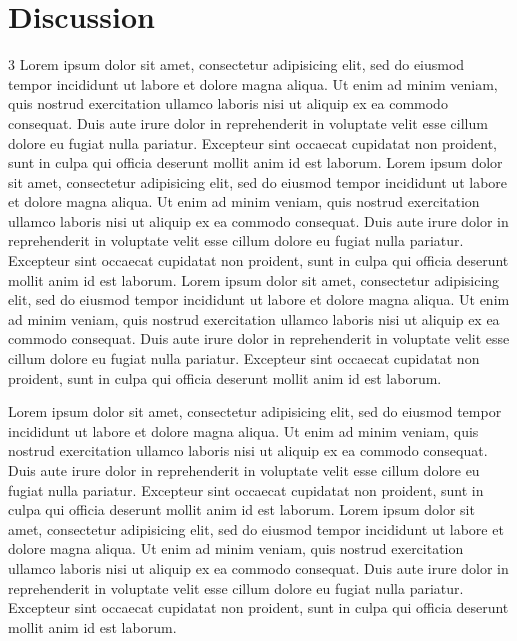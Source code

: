 \documentclass[kulak]{kulakposter}
\begin{document}
\section*{Discussion}
\begin{multicols}{3}\setlength{\columnseprule}{0pt}
	Lorem ipsum dolor sit amet, consectetur adipisicing elit, sed do eiusmod tempor incididunt ut labore et dolore magna aliqua. Ut enim ad minim veniam, quis nostrud exercitation ullamco laboris nisi ut aliquip ex ea commodo consequat. Duis aute irure dolor in reprehenderit in voluptate velit esse cillum dolore eu fugiat nulla pariatur. Excepteur sint occaecat cupidatat non proident, sunt in culpa qui officia deserunt mollit anim id est laborum. Lorem ipsum dolor sit amet, consectetur adipisicing elit, sed do eiusmod tempor incididunt ut labore et dolore magna aliqua. Ut enim ad minim veniam, quis nostrud exercitation ullamco laboris nisi ut aliquip ex ea commodo consequat. Duis aute irure dolor in reprehenderit in voluptate velit esse cillum dolore eu fugiat nulla pariatur. Excepteur sint occaecat cupidatat non proident, sunt in culpa qui officia deserunt mollit anim id est laborum.
	Lorem ipsum dolor sit amet, consectetur adipisicing elit, sed do eiusmod tempor incididunt ut labore et dolore magna aliqua. Ut enim ad minim veniam, quis nostrud exercitation ullamco laboris nisi ut aliquip ex ea commodo consequat. Duis aute irure dolor in reprehenderit in voluptate velit esse cillum dolore eu fugiat nulla pariatur. Excepteur sint occaecat cupidatat non proident, sunt in culpa qui officia deserunt mollit anim id est laborum.
	
	Lorem ipsum dolor sit amet, consectetur adipisicing elit, sed do eiusmod tempor incididunt ut labore et dolore magna aliqua. Ut enim ad minim veniam, quis nostrud exercitation ullamco laboris nisi ut aliquip ex ea commodo consequat. Duis aute irure dolor in reprehenderit in voluptate velit esse cillum dolore eu fugiat nulla pariatur. Excepteur sint occaecat cupidatat non proident, sunt in culpa qui officia deserunt mollit anim id est laborum. Lorem ipsum dolor sit amet, consectetur adipisicing elit, sed do eiusmod tempor incididunt ut labore et dolore magna aliqua. Ut enim ad minim veniam, quis nostrud exercitation ullamco laboris nisi ut aliquip ex ea commodo consequat. Duis aute irure dolor in reprehenderit in voluptate velit esse cillum dolore eu fugiat nulla pariatur. Excepteur sint occaecat cupidatat non proident, sunt in culpa qui officia deserunt mollit anim id est laborum.
\end{multicols}
\end{document}
